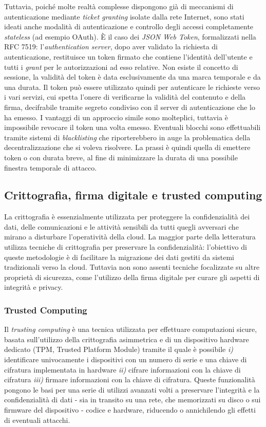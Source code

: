 \documentclass[../main.tex]{subfiles}
\begin{document}
Tuttavia, poiché molte realtà complesse dispongono già di meccanismi di autenticazione mediante \textit{ticket granting} isolate dalla rete Internet, sono stati ideati anche modalità di autenticazione e controllo degli accessi completamente \textit{stateless} (ad esempio OAuth).
È il caso dei \textit{JSON Web Token}, formalizzati nella RFC 7519: l'\textit{authentication server}, dopo aver validato la richiesta di autenticazione, restituisce un token  firmato che contiene l'identità dell'utente e tutti i \textit{grant} per le autorizzazioni ad esso relative.
Non esiste il concetto di sessione, la validità del token è data esclusivamente da una marca temporale e da una durata. Il token può essere utilizzato quindi per autenticare le richieste verso i vari servizi, cui spetta l'onere di verificarne la validità del contenuto e della firma, decifrabile tramite segreto condiviso con il server di autenticazione che lo ha emesso.
I vantaggi di un approccio simile sono molteplici, tuttavia è impossibile revocare il token una volta emesso. Eventuali blocchi sono effettuabili tramite sistemi di \textit{blacklisting} che riporterebbero in auge la problematica della decentralizzazione che si voleva risolvere. La prassi è quindi quella di emettere token  o con durata breve, al fine di minimizzare la durata di una possibile finestra temporale di attacco.

\subsection{Crittografia, firma digitale e trusted computing}
La crittografia è essenzialmente utilizzata per proteggere la confidenzialità dei dati, delle comunicazioni e le attività sensibili da tutti quegli avversari che mirano a disturbare l'operatività della cloud.
La maggior parte della letteratura utilizza tecniche di crittografia per preservare la confidenzialità: l'obiettivo di queste metodologie è di facilitare la migrazione dei dati gestiti da sistemi tradizionali verso la cloud.
Tuttavia non sono assenti tecniche focalizzate su altre proprietà di sicurezza, come l'utilizzo della firma digitale per curare gli aspetti di integrità e privacy.

\subsubsection{Trusted Computing}
Il \textit{trusting computing} è una tecnica utilizzata per effettuare computazioni sicure, basata sull'utilizzo della crittografia asimmetrica e di un dispositivo hardware dedicato (TPM, Trusted Platform Module) tramite il quale è possibile \textit{i)} identificare univocamente i dispositivi con un numero di serie e una chiave di cifratura implementata in hardware \textit{ii)} cifrare informazioni con la chiave di cifratura \textit{iii)} firmare informazioni con la chiave di cifratura.
Queste funzionalità pongono le basi per una serie di utilizzi avanzati volti a preservare l'integrità e la confidenzialità di dati - sia in transito su una rete, che memorizzati su disco o sui firmware del dispositivo - codice e hardware, riducendo o annichilendo gli effetti di eventuali attacchi.
\end{document}
